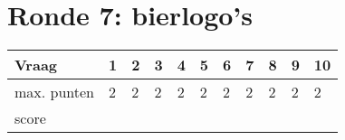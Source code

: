 
\section{Ronde 7: bierlogo's}
\begin{questions}

\question[2] \enspace\hrulefill
\vspace{5mm}
\question[2] \enspace\hrulefill
\vspace{5mm}
\question[2] \enspace\hrulefill
\vspace{5mm}
\question[2] \enspace\hrulefill
\vspace{5mm}
\question[2] \enspace\hrulefill
\vspace{5mm}
\question[2] \enspace\hrulefill
\vspace{5mm}
\question[2] \enspace\hrulefill
\vspace{5mm}
\question[2] \enspace\hrulefill
\vspace{5mm}
\question[2] \enspace\hrulefill
\vspace{5mm}
\question[2] \enspace\hrulefill

\end{questions}
\begin{table}[!b]
\centering
\begin{tabular}{|l|l|l|l|l|l|l|l|l|l|l|}
\hline
Vraag       & 1 & 2 & 3 & 4 & 5 & 6 & 7 & 8 & 9 & 10 \\ \hline
max. punten & 2 & 2 & 2 & 2 & 2 & 2 & 2 & 2 & 2 & 2  \\ \hline
score       &   &   &   &   &   &   &   &   &   &    \\ \hline
\end{tabular}
\end{table}
\newpage
